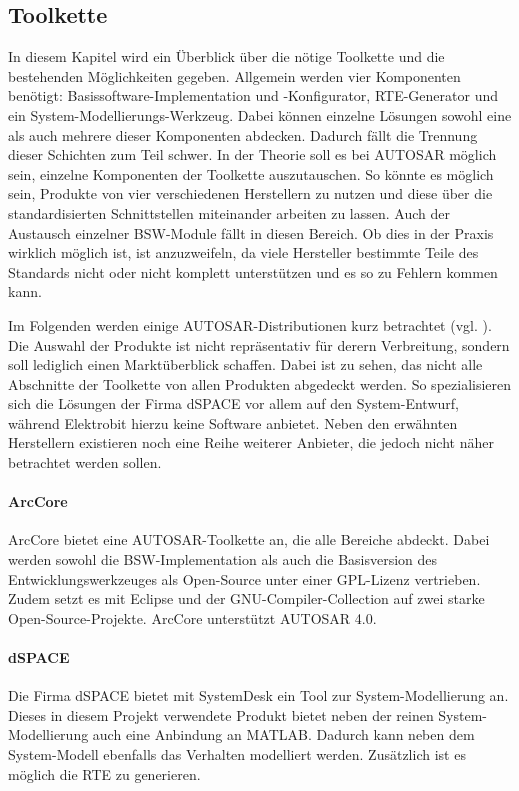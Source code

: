 \documentclass[
  a4paper,					    %
  twoside,
  DIV=calc,     				%
  bibliography=totoc,
  cleardoublepage=empty,
  ngerman,     					%
  final       					%
]{scrbook}
\begin{document}
\subsection{Toolkette}
\label{sec:Toolkette}
In diesem Kapitel wird ein Überblick über die nötige Toolkette und die bestehenden Möglichkeiten gegeben. Allgemein werden vier Komponenten benötigt: Basissoftware-Implementation und -Konfigurator, RTE-Generator und ein System-Modellierungs-Werkzeug. Dabei können einzelne Lösungen sowohl eine als auch mehrere dieser Komponenten abdecken. Dadurch fällt die Trennung dieser Schichten zum Teil schwer. In der Theorie soll es bei AUTOSAR möglich sein, einzelne Komponenten der Toolkette auszutauschen. So könnte es möglich sein, Produkte von vier verschiedenen Herstellern zu nutzen und diese über die standardisierten Schnittstellen miteinander arbeiten zu lassen. Auch der Austausch einzelner BSW-Module fällt in diesen Bereich. Ob dies in der Praxis wirklich möglich ist, ist anzuzweifeln, da viele Hersteller bestimmte Teile des Standards nicht oder nicht komplett unterstützen und es so zu Fehlern kommen kann.

Im Folgenden werden einige AUTOSAR-Distributionen kurz betrachtet (vgl. \cite{wiki:autosar}). Die Auswahl der Produkte ist nicht repräsentativ für derern Verbreitung, sondern soll lediglich einen Marktüberblick schaffen. Dabei ist zu sehen, das nicht alle Abschnitte der Toolkette von allen Produkten abgedeckt werden. So spezialisieren sich die Lösungen der Firma dSPACE vor allem auf den System-Entwurf, während Elektrobit hierzu keine Software anbietet. Neben den erwähnten Herstellern existieren noch eine Reihe weiterer Anbieter, die jedoch nicht näher betrachtet werden sollen.

\paragraph{ArcCore}
ArcCore bietet eine AUTOSAR-Toolkette an, die alle Bereiche abdeckt. Dabei werden sowohl die BSW-Implementation als auch die Basisversion des Entwicklungswerkzeuges als Open-Source unter einer GPL-Lizenz vertrieben. Zudem setzt es mit Eclipse und der GNU-Compiler-Collection auf zwei starke Open-Source-Projekte. ArcCore unterstützt AUTOSAR 4.0.

\paragraph{dSPACE}
Die Firma dSPACE bietet mit SystemDesk ein Tool zur System-Modellierung an. Dieses in diesem Projekt verwendete Produkt bietet neben der reinen System-Modellierung auch eine Anbindung an MATLAB. Dadurch kann neben dem System-Modell ebenfalls das Verhalten modelliert werden. Zusätzlich ist es möglich die RTE zu generieren.
\end{document}
